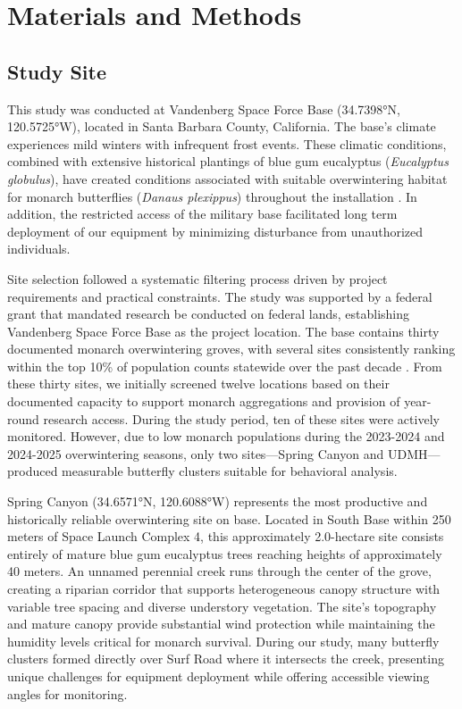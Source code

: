 \section{Materials and Methods}

\subsection{Study Site}

This study was conducted at Vandenberg Space Force Base (34.7398°N, 120.5725°W), located in Santa Barbara County, California. The base's climate experiences mild winters with infrequent frost events. These climatic conditions, combined with extensive historical plantings of blue gum eucalyptus (\textit{Eucalyptus globulus}), have created conditions associated with suitable overwintering habitat for monarch butterflies (\textit{Danaus plexippus}) throughout the installation \autocite{xercesGuideWesternMonarch2025}. In addition, the restricted access of the military base facilitated long term deployment of our equipment by minimizing disturbance from unauthorized individuals.

Site selection followed a systematic filtering process driven by project requirements and practical constraints. The study was supported by a federal grant that mandated research be conducted on federal lands, establishing Vandenberg Space Force Base as the project location. The base contains thirty documented monarch overwintering groves, with several sites consistently ranking within the top 10\% of population counts statewide over the past decade \autocite{xercesGuideWesternMonarch2025}. From these thirty sites, we initially screened twelve locations based on their documented capacity to support monarch aggregations and provision of year-round research access. During the study period, ten of these sites were actively monitored. However, due to low monarch populations during the 2023-2024 and 2024-2025 overwintering seasons, only two sites—Spring Canyon and UDMH—produced measurable butterfly clusters suitable for behavioral analysis.

Spring Canyon (34.6571°N, 120.6088°W) represents the most productive and historically reliable overwintering site on base. Located in South Base within 250 meters of Space Launch Complex 4, this approximately 2.0-hectare site consists entirely of mature blue gum eucalyptus trees reaching heights of approximately 40 meters. An unnamed perennial creek runs through the center of the grove, creating a riparian corridor that supports heterogeneous canopy structure with variable tree spacing and diverse understory vegetation. The site's topography and mature canopy provide substantial wind protection while maintaining the humidity levels critical for monarch survival. During our study, many butterfly clusters formed directly over Surf Road where it intersects the creek, presenting unique challenges for equipment deployment while offering accessible viewing angles for monitoring.


